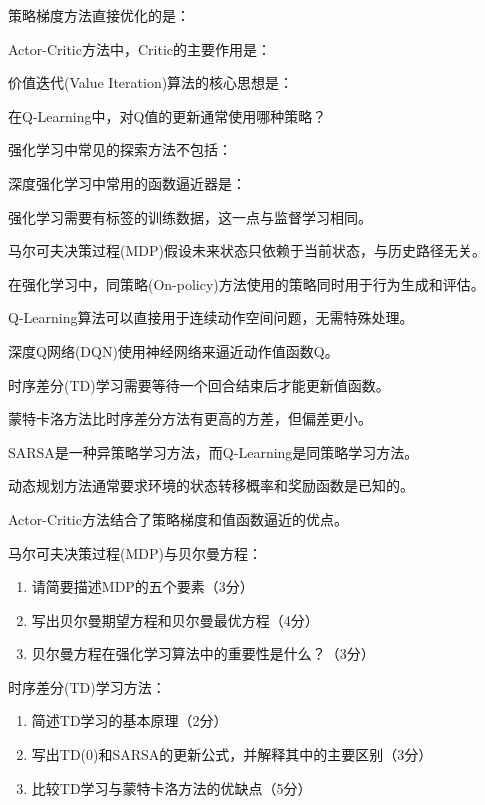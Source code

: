 \documentclass[zihao=5,noanswers]{BHCexam}
\begin{document}
\begin{questions}
\question 策略梯度方法直接优化的是：

\question Actor-Critic方法中，Critic的主要作用是：

\question 价值迭代(Value Iteration)算法的核心思想是：

\question 在Q-Learning中，对Q值的更新通常使用哪种策略？

\question 强化学习中常见的探索方法不包括：

\question 深度强化学习中常用的函数逼近器是：

\panduan

\question 强化学习需要有标签的训练数据，这一点与监督学习相同。

\question 马尔可夫决策过程(MDP)假设未来状态只依赖于当前状态，与历史路径无关。

\question 在强化学习中，同策略(On-policy)方法使用的策略同时用于行为生成和评估。

\question Q-Learning算法可以直接用于连续动作空间问题，无需特殊处理。

\question 深度Q网络(DQN)使用神经网络来逼近动作值函数Q。

\question 时序差分(TD)学习需要等待一个回合结束后才能更新值函数。

\question 蒙特卡洛方法比时序差分方法有更高的方差，但偏差更小。

\question SARSA是一种异策略学习方法，而Q-Learning是同策略学习方法。

\question 动态规划方法通常要求环境的状态转移概率和奖励函数是已知的。

\question Actor-Critic方法结合了策略梯度和值函数逼近的优点。

\jianda

\question[10] 马尔可夫决策过程(MDP)与贝尔曼方程：
\begin{enumerate}
    \item 请简要描述MDP的五个要素（3分）
    \item 写出贝尔曼期望方程和贝尔曼最优方程（4分）
    \item 贝尔曼方程在强化学习算法中的重要性是什么？（3分）
\end{enumerate}

\question[10] 时序差分(TD)学习方法：
\begin{enumerate}
    \item 简述TD学习的基本原理（2分）
    \item 写出TD(0)和SARSA的更新公式，并解释其中的主要区别（3分）
    \item 比较TD学习与蒙特卡洛方法的优缺点（5分）
\end{enumerate}


\end{questions}
\end{document}
